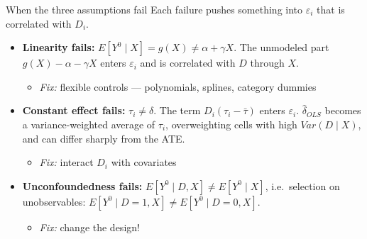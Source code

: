 \documentclass[
  11pt,
  ignorenonframetext,
  aspectratio=169,
]{beamer}
\providecommand{\tightlist}{%
  \setlength{\itemsep}{0pt}\setlength{\parskip}{0pt}}
\begin{document}
\begin{frame}{When the three assumptions fail}
\protect{}\label{when-the-three-assumptions-fail}
Each failure pushes something into \(\varepsilon_i\) that is correlated
with \(D_i\).

\begin{itemize}
\tightlist
\item
  \textbf{Linearity fails:}
  \(E[Y^0 \mid X] = g(X) \neq \alpha + \gamma X\). The unmodeled part
  \(g(X) - \alpha - \gamma X\) enters \(\varepsilon_i\) and is
  correlated with \(D\) through \(X\).

  \begin{itemize}
  \tightlist
  \item
    \emph{Fix:} flexible controls --- polynomials, splines, category
    dummies
  \end{itemize}
\item
  \textbf{Constant effect fails:} \(\tau_i \neq \delta\). The term
  \(D_i(\tau_i - \bar\tau)\) enters \(\varepsilon_i\).
  \(\hat\delta_{OLS}\) becomes a variance-weighted average of
  \(\tau_i\), overweighting cells with high \(Var(D \mid X)\), and can
  differ sharply from the ATE.

  \begin{itemize}
  \tightlist
  \item
    \emph{Fix:} interact \(D_i\) with covariates
  \end{itemize}
\item
  \textbf{Unconfoundedness fails:}
  \(E[Y^0 \mid D, X] \neq E[Y^0 \mid X]\), i.e.~selection on
  unobservables: \(E[Y^0 \mid D{=}1, X] \neq E[Y^0 \mid D{=}0, X]\).

  \begin{itemize}
  \tightlist
  \item
    \emph{Fix:} change the design!
  \end{itemize}
\end{itemize}
\end{frame}
\end{document}
